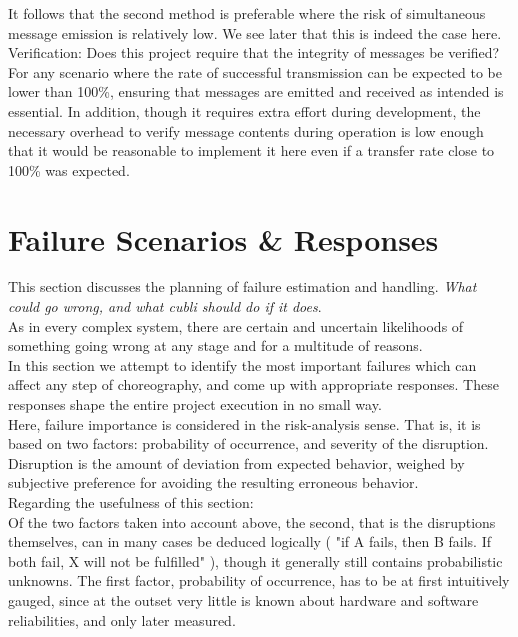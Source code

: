 It follows that the second method is preferable where the risk of simultaneous message emission is relatively low. We see later that this is indeed the case here. \\


Verification: Does this project require that the integrity of messages be verified? For any scenario where the rate of successful transmission can be expected to be lower than 100\%, ensuring that messages are emitted and received as intended is essential. In addition, though it requires extra effort during development, the necessary overhead to verify message contents during operation is low enough that it would be reasonable to implement it here even if a transfer rate close to 100\% was expected.




\section{Failure Scenarios \& Responses}
This section discusses the planning of failure estimation and handling.
\textit{What could go wrong, and what cubli should do if it does}.\\

As in every complex system, there are certain and uncertain likelihoods of something going wrong at any stage and for a multitude of reasons.\\

In this section we attempt to identify the most important failures which can affect any step of choreography, and come up with appropriate responses. These responses shape the entire project execution in no small way.\\

Here, failure importance is considered in the risk-analysis sense. That is, it is based on two factors: probability of occurrence, and severity of the disruption. Disruption is the amount of deviation from expected behavior, weighed by subjective preference for avoiding the resulting erroneous behavior. \\

Regarding the usefulness of this section:\\

Of the two factors taken into account above, the second, that is the disruptions themselves, can in many cases be deduced logically ( "if A fails, then B fails. If both fail, X will not be fulfilled" ), though it generally still contains probabilistic unknowns. The first factor, probability of occurrence, has to be at first intuitively gauged, since at the outset very little is known about hardware and software reliabilities, and only later measured.\\

